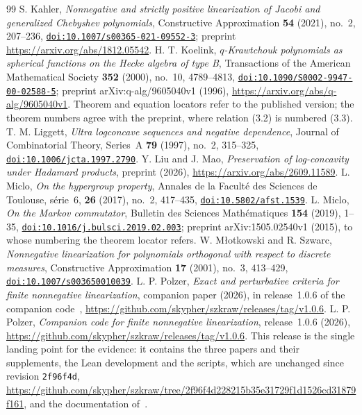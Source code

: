 \begin{thebibliography}{99}
 S. Kahler, \emph{Nonnegative and strictly positive linearization of Jacobi and generalized Chebyshev polynomials}, Constructive Approximation \textbf{54} (2021), no.~2, 207--236, \href{https://doi.org/10.1007/s00365-021-09552-3}{\nolinkurl{doi:10.1007/s00365-021-09552-3}}; preprint \url{https://arxiv.org/abs/1812.05542}.
 H. T. Koelink, \emph{$q$-Krawtchouk polynomials as spherical functions on the Hecke algebra of type B}, Transactions of the American Mathematical Society \textbf{352} (2000), no.~10, 4789--4813, \href{https://doi.org/10.1090/S0002-9947-00-02588-5}{\nolinkurl{doi:10.1090/S0002-9947-00-02588-5}}; preprint arXiv:q-alg/9605040v1 (1996), \url{https://arxiv.org/abs/q-alg/9605040v1}. Theorem and equation locators refer to the published version; the theorem numbers agree with the preprint, where relation (3.2) is numbered (3.3).
 T. M. Liggett, \emph{Ultra logconcave sequences and negative dependence}, Journal of Combinatorial Theory, Series~A \textbf{79} (1997), no.~2, 315--325, \href{https://doi.org/10.1006/jcta.1997.2790}{\nolinkurl{doi:10.1006/jcta.1997.2790}}.
 Y. Liu and J. Mao, \emph{Preservation of log-concavity under Hadamard products}, preprint (2026), \url{https://arxiv.org/abs/2609.11589}.
 L. Miclo, \emph{On the hypergroup property}, Annales de la Facult\'e des Sciences de Toulouse, s\'erie~6, \textbf{26} (2017), no.~2, 417--435, \href{https://doi.org/10.5802/afst.1539}{\nolinkurl{doi:10.5802/afst.1539}}.
 L. Miclo, \emph{On the Markov commutator}, Bulletin des Sciences Math\'ematiques \textbf{154} (2019), 1--35, \href{https://doi.org/10.1016/j.bulsci.2019.02.003}{\nolinkurl{doi:10.1016/j.bulsci.2019.02.003}}; preprint arXiv:1505.02540v1 (2015), to whose numbering the theorem locator refers.
 W. M{\l}otkowski and R. Szwarc, \emph{Nonnegative linearization for polynomials orthogonal with respect to discrete measures}, Constructive Approximation \textbf{17} (2001), no.~3, 413--429, \href{https://doi.org/10.1007/s003650010039}{\nolinkurl{doi:10.1007/s003650010039}}.
 L. P. Polzer, \emph{Exact and perturbative criteria for finite nonnegative linearization}, companion paper (2026), in release~1.0.6 of the companion code~\cite{code}, \url{https://github.com/skypher/szkraw/releases/tag/v1.0.6}.
 L. P. Polzer, \emph{Companion code for finite nonnegative linearization}, release~1.0.6 (2026), \url{https://github.com/skypher/szkraw/releases/tag/v1.0.6}. This release is the single landing point for the evidence: it contains the three papers and their supplements, the Lean development and the scripts, which are unchanged since revision \texttt{2f96f4d}, \url{https://github.com/skypher/szkraw/tree/2f96f4d228215b35e31729f1d1526cd31879f161}, and the documentation of~\cite{docs}.

\end{thebibliography}
